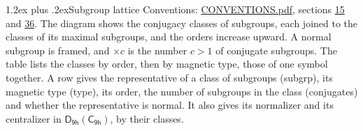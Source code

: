 \documentclass[10pt,a4paper]{article}
\makeatletter
\renewcommand\section{\@startsection{section}{1}{\z@}{-3ex plus -1ex minus -.2ex}%
  {1.2ex plus .2ex}{\normalfont\large\sffamily\bfseries\color{parttitle}}}
\numberwithin{equation}{section}
\newcommand{\grp}[1]{\mathsf{#1}}
\makeatother
\begin{document}
\section{Subgroup lattice}\label{s:subgroups}
Conventions: \href{../../CONVENTIONS.pdf}{CONVENTIONS.pdf}, sections \href{../../../rotation/CONVENTIONS.pdf\#conv.15}{15} and \href{../../CONVENTIONS.pdf\#conv.36}{36}.
The diagram shows the conjugacy classes of subgroups, each joined to the classes of its maximal subgroups, and the orders increase upward. \label{n:index.conjugates.c}\label{n:mark.conjugates}A normal subgroup is framed, and ${\times}c$ is the number $c > 1$ of conjugate subgroups. The table lists the classes by order, then by magnetic type, those of one symbol together. \label{n:head.subgroup}\label{n:head.magnetic.type}\label{n:head.order}\label{n:head.conjugates}\label{n:head.normal}A row gives the representative of a class of subgroups (subgrp), its magnetic type (type), its order, the number of subgroups in the class (conjugates) and whether the representative is normal. \label{n:head.normalizer}\label{n:head.centralizer}It also gives its normalizer and its centralizer in $\grp{D_{9h}}(\grp{C_{9h}})$, by their classes. 
\end{document}
